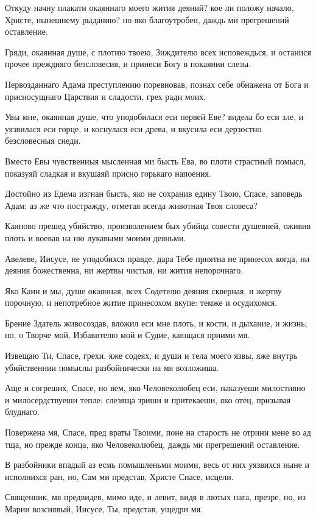 Откуду начну плакати окаяннаго моего жития деяний? кое ли положу начало, Христе, нынешнему рыданию? но яко благоутробен, даждь ми прегрешений оставление.

Гряди, окаянная душе, с плотию твоею, Зиждителю всех исповеждься, и останися прочее преждняго безсловесия, и принеси Богу в покаянии слезы.

Первозданнаго Адама преступлению поревновав, познах себе обнажена от Бога и присносущнаго Царствия и сладости, грех ради моих.

Увы мне, окаянная душе, что уподобилася еси первей Еве? видела бо еси зле, и уязвилася еси горце, и коснулася еси древа, и вкусила еси дерзостно безсловесныя снеди.

Вместо Евы чувственныя мысленная ми бысть Ева, во плоти страстный помысл, показуяй сладкая и вкушаяй присно горькаго напоения.

Достойно из Едема изгнан бысть, яко не сохранив едину Твою, Спасе, заповедь Адам: аз же что постражду, отметая всегда животная Твоя словеса?

Каиново прешед убийство, произволением бых убийца совести душевней, оживив плоть и воевав на ню лукавыми моими деяньми.

Авелеве, Иисусе, не уподобихся правде, дара Тебе приятна не принесох когда, ни деяния божественна, ни жертвы чистыя, ни жития непорочнаго.

Яко Каин и мы, душе окаянная, всех Содетелю деяния скверная, и жертву порочную, и непотребное житие принесохом вкупе: темже и осудихомся.

Брение Здатель живосоздав, вложил еси мне плоть, и кости, и дыхание, и жизнь; но, о Творче мой, Избавителю мой и Судие, кающася приими мя.

Извещаю Ти, Спасе, грехи, яже содеях, и души и тела моего язвы, яже внутрь убийственнии помыслы разбойнически на мя возложиша.

Аще и согреших, Спасе, но вем, яко Человеколюбец еси, наказуеши милостивно и милосердствуеши тепле: слезяща зриши и притекаеши, яко отец, призывая блуднаго.

Повержена мя, Спасе, пред враты Твоими, поне на старость не отрини мене во ад тща, но прежде конца, яко Человеколюбец, даждь ми прегрешений оставление.

В разбойники впадый аз есмь помышленьми моими, весь от них уязвихся ныне и исполнихся ран, но, Сам ми представ, Христе Спасе, исцели.

Священник, мя предвидев, мимо иде, и левит, видя в лютых нага, презре, но, из Марии возсиявый, Иисусе, Ты, представ, ущедри мя.

